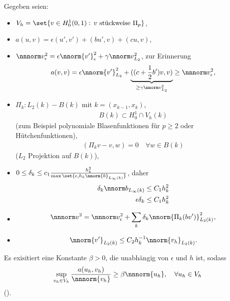 Gegeben seien:
\begin{itemize}
\item $V_{h} = \set{v \in H_{0}^{1}(0, 1): \, v \text{ stückweise } \Pi_{p}}$, 
\item $a(u, v) = \epsilon(u', v') + (bu', v) + (cu, v)$, 
\item $\nnnorm v_{\epsilon}^{2} = \epsilon \nnorm {v'}_{\epsilon}^{2} + \gamma \nnorm v _{L_{2}}^{2}$, zur Erinnerung
  \begin{align}\label{eq:1}
    a(v, v) = \epsilon \nnorm{v'}_{L_{2}}^{2} + \underbrace{(( c + \frac 12 b')v, v)}_{\geq \gamma \nnorm v_{L_{2}}^{2}} \geq \nnnorm v _{\epsilon}^{2},
  \end{align}
\item $\Pi_{k}: L_{2}(k) - B(k)$ mit $k = (x_{k-1}, x_{k})$,
  \begin{align*}
    B(k) \subset H_{0}^{1} \cap V_{h}(k)
  \end{align*}
  (zum Beispiel polynomiale Blasenfunktionen für $p \geq 2$ oder Hütchenfunktionen),
  \begin{align}\label{eq:2}
    (\Pi_{k} v - v, w) = 0 \quad \forall w \in B(k)
  \end{align}
  ($L_{2}$ Projektion auf $B(k)$), 
\item $0 \leq \delta_{k} \leq c_{1} \frac{h_{k}^{2}} {\max \set{\epsilon, h_{k}\nnorm{b}_{L_{\infty}(k)}}}$, daher
  \begin{align}
    \delta_{k} \nnorm b_{L_{\infty}(k)} &\leq C_{1} h_{k}^{2} \label{eq:3}\\
    \epsilon\delta_{k} &\leq C_{1} h_{k}^{2} \label{eq:4}\\
  \end{align}
\item
  \begin{align}\label{eq:5}
    \nnnorm v ^{2} = \nnnorm v_{\epsilon}^{2} + \sum_{k} \delta_{k} \nnorm{\Pi_{k} (bv')}^{2}_{L_{2}(k)}, 
  \end{align}
\item 
  \begin{align}\label{eq:6}
    \nnorm {v'}_{L_{2}(k)}  \leq C_{2} h_{k}^{-1} \nnorm {v_{h}}_{L_{2}(k)}. 
  \end{align}
\end{itemize}
\begin{satz}\label{thm:6-23}
  Es exisitiert eine Konstante $\beta > 0$, die unabhängig von $\epsilon$ und $h$ ist, sodass
  \begin{align*}
    \sup_{v_{h} \in V_{h}} \frac{a(u_{h}, v_{h})}{\nnnorm {v_{h}}} \geq \beta \nnnorm {u_{h}}, \quad \forall u_{h} \in V_{h}
  \end{align*}
  (). 
\end{satz}
